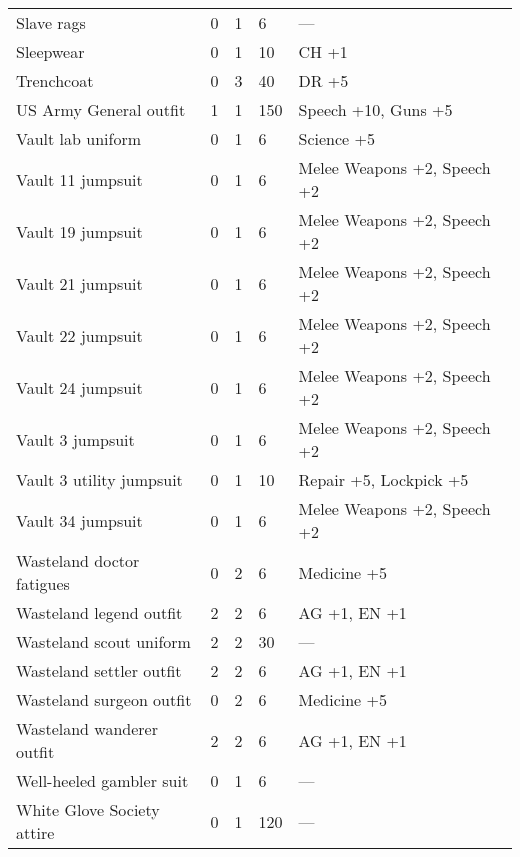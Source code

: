 \begin{longtable}{|p{6cm}|p{0.9cm}|p{1.2cm}|p{1.2cm}|p{6cm}|}
Slave rags & 0 & 1 & 6 & — \\
Sleepwear & 0 & 1 & 10 & CH +1 \\
Trenchcoat & 0 & 3 & 40 & DR +5 \\
US Army General outfit & 1 & 1 & 150 & Speech +10, Guns +5 \\
Vault lab uniform & 0 & 1 & 6 & Science +5 \\
Vault 11 jumpsuit & 0 & 1 & 6 & Melee Weapons +2, Speech +2 \\
Vault 19 jumpsuit & 0 & 1 & 6 & Melee Weapons +2, Speech +2 \\
Vault 21 jumpsuit & 0 & 1 & 6 & Melee Weapons +2, Speech +2 \\
Vault 22 jumpsuit & 0 & 1 & 6 & Melee Weapons +2, Speech +2 \\
Vault 24 jumpsuit & 0 & 1 & 6 & Melee Weapons +2, Speech +2 \\
Vault 3 jumpsuit & 0 & 1 & 6 & Melee Weapons +2, Speech +2 \\
Vault 3 utility jumpsuit & 0 & 1 & 10 & Repair +5, Lockpick +5 \\
Vault 34 jumpsuit & 0 & 1 & 6 & Melee Weapons +2, Speech +2 \\
Wasteland doctor fatigues & 0 & 2 & 6 & Medicine +5 \\
Wasteland legend outfit & 2 & 2 & 6 & AG +1, EN +1 \\
Wasteland scout uniform & 2 & 2 & 30 & — \\
Wasteland settler outfit & 2 & 2 & 6 & AG +1, EN +1 \\
Wasteland surgeon outfit & 0 & 2 & 6 & Medicine +5 \\
Wasteland wanderer outfit & 2 & 2 & 6 & AG +1, EN +1 \\
Well-heeled gambler suit & 0 & 1 & 6 & — \\
White Glove Society attire & 0 & 1 & 120 & — \\
\hline
\end{longtable}
